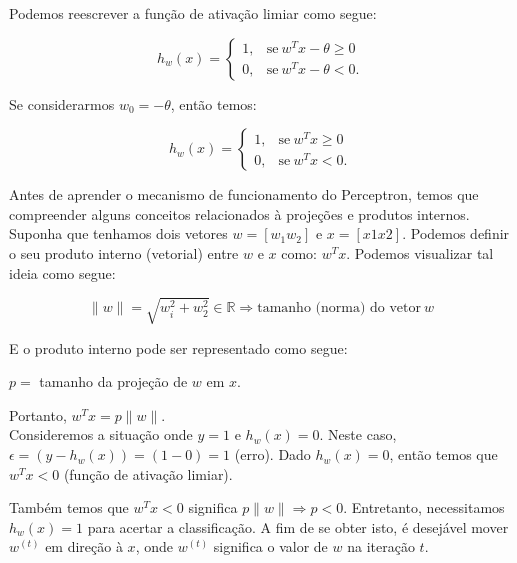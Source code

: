 Podemos reescrever a função de ativação limiar como segue:

\begin{equation}
\label{e.limiar_function_r1}
h_w(x) =
   \begin{cases}
      1, & \text{se}\ w^Tx - \theta \geq 0 \\
      0, & \text{se}\ w^Tx  - \theta < 0.
    \end{cases}
\end{equation}

Se considerarmos $w_0 = -\theta$, então temos:

\begin{equation}
\label{e.limiar_function_r2}
h_w(x) =
   \begin{cases}
      1, & \text{se}\ w^Tx \geq 0 \\
      0, & \text{se}\ w^Tx < 0.
    \end{cases}
\end{equation}

Antes de aprender o mecanismo de funcionamento do Perceptron, temos que compreender alguns conceitos relacionados à projeções e produtos internos. Suponha que tenhamos dois vetores $w = [w_1 w_2]$ e $x = [x1 x2]$. Podemos definir o seu produto interno (vetorial) entre $w$ e $x$ como: $w^Tx$. Podemos visualizar tal ideia como segue:

\begin{equation}
\parallel w \parallel = \sqrt{w_i^2 + w_2^2} \in \mathbb{R} \Rightarrow \text{tamanho (norma) do vetor} \ w	
\end{equation}

E o produto interno pode ser representado como segue:

\begin{center}
$p =$ tamanho da projeção de $w$ em $x$.
\end{center}

Portanto, $w^Tx = p \parallel w \parallel$.\\

Consideremos a situação onde $y = 1$ e $h_w(x) = 0$. Neste caso, $\epsilon = (y - h_w(x)) = (1 - 0) = 1$ (erro). Dado $h_w(x) = 0$, então temos que $w^Tx < 0$ (função de ativação limiar).

Também temos que $w^Tx < 0$ significa $p \parallel w \parallel \Rightarrow p < 0$. Entretanto, necessitamos $h_w(x) = 1$ para acertar a classificação. A fim de se obter isto, é desejável mover $w^{(t)}$ em direção à $x$, onde $w^{(t)}$ significa o valor de $w$ na iteração $t$.

